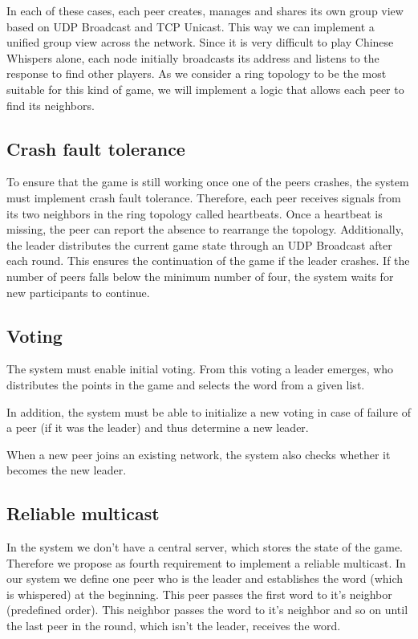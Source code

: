 \documentclass[runningheads]{llncs}
\begin{document}
        In each of these cases, each peer creates, manages and shares its own group view based on UDP Broadcast and TCP Unicast. This way we can implement a unified group view across the network. Since it is very difficult to play Chinese Whispers alone, each node initially broadcasts its address and listens to the response to find other players. As we consider a ring topology to be the most suitable for this kind of game, we will implement a logic that allows each peer to find its neighbors.
        
    \subsection{Crash fault tolerance}
        To ensure that the game is still working once one of the peers crashes, the system must implement crash fault tolerance. Therefore, each peer receives signals from its two neighbors in the ring topology called heartbeats. Once a heartbeat is missing, the peer can report the absence to rearrange the topology. Additionally, the leader distributes the current game state through an UDP Broadcast after each round. This ensures the continuation of the game if the leader crashes. If the number of peers falls below the minimum number of four, the system waits for new participants to continue.
    
    \subsection{Voting}
        The system must enable initial voting. From this voting a leader emerges, who distributes the points in the game and selects the word from a given list.
        
        In addition, the system must be able to initialize a new voting in case of failure of a peer (if it was the leader) and thus determine a new leader. 
    
        When a new peer joins an existing network, the system also checks whether it becomes the new leader.
    
    \subsection{Reliable multicast} 
        In the system we don't have a central server, which stores the state of the game. Therefore we propose as fourth requirement to implement a reliable multicast. In our system we define one peer who is the leader and establishes the word (which is whispered) at the beginning. This peer passes the first word to it's neighbor (predefined order). This neighbor passes the word to it's neighbor and so on until the last peer in the round, which isn't the leader, receives the word.  
        
\end{document}
